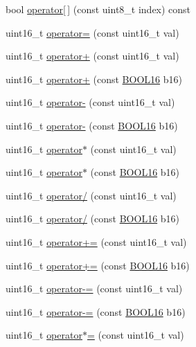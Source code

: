 \begin{DoxyCompactItemize}
bool \hyperlink{struct_b_o_o_l16_ae2e6627d3440c7132acd1933d27b7ac8}{operator\mbox{[}$\,$\mbox{]}} (const uint8\+\_\+t index) const
\item 
uint16\+\_\+t \hyperlink{struct_b_o_o_l16_a337925a096cb05f2d729cec233f672f4}{operator=} (const uint16\+\_\+t val)
\item 
uint16\+\_\+t \hyperlink{struct_b_o_o_l16_a83abcd9bea7824fec9a443f6cd1ea4ef}{operator+} (const uint16\+\_\+t val)
\item 
uint16\+\_\+t \hyperlink{struct_b_o_o_l16_a7b3fdeeb158929cbe1b9e38b7e0addb1}{operator+} (const \hyperlink{struct_b_o_o_l16}{B\+O\+O\+L16} b16)
\item 
uint16\+\_\+t \hyperlink{struct_b_o_o_l16_a5aec2aa08b16b10f49fa019b9d3138e3}{operator-\/} (const uint16\+\_\+t val)
\item 
uint16\+\_\+t \hyperlink{struct_b_o_o_l16_a0c74b8b86a62ddadbc40d39ca74b35a6}{operator-\/} (const \hyperlink{struct_b_o_o_l16}{B\+O\+O\+L16} b16)
\item 
uint16\+\_\+t \hyperlink{struct_b_o_o_l16_a3511b645210e2816f439ea1983fe787e}{operator$\ast$} (const uint16\+\_\+t val)
\item 
uint16\+\_\+t \hyperlink{struct_b_o_o_l16_af563a43c5318213f08a27f7c7414d74a}{operator$\ast$} (const \hyperlink{struct_b_o_o_l16}{B\+O\+O\+L16} b16)
\item 
uint16\+\_\+t \hyperlink{struct_b_o_o_l16_a2cb6c702a1bbc8aa53bdb991135b1906}{operator/} (const uint16\+\_\+t val)
\item 
uint16\+\_\+t \hyperlink{struct_b_o_o_l16_ac7d29d83718de6f76c22a7883472f77c}{operator/} (const \hyperlink{struct_b_o_o_l16}{B\+O\+O\+L16} b16)
\item 
uint16\+\_\+t \hyperlink{struct_b_o_o_l16_a6b2a394d85747eaf07bc1714044f58c3}{operator+=} (const uint16\+\_\+t val)
\item 
uint16\+\_\+t \hyperlink{struct_b_o_o_l16_a7d60f0d408ef0d054697ba07a364a155}{operator+=} (const \hyperlink{struct_b_o_o_l16}{B\+O\+O\+L16} b16)
\item 
uint16\+\_\+t \hyperlink{struct_b_o_o_l16_a9cb670916112ed0a5ef6387e5a029e17}{operator-\/=} (const uint16\+\_\+t val)
\item 
uint16\+\_\+t \hyperlink{struct_b_o_o_l16_a734895715c8196113269c604d8d543be}{operator-\/=} (const \hyperlink{struct_b_o_o_l16}{B\+O\+O\+L16} b16)
\item 
uint16\+\_\+t \hyperlink{struct_b_o_o_l16_a1d95ccb84d72f88eb9d8628aa5aeb752}{operator$\ast$=} (const uint16\+\_\+t val)
\item 

\end{DoxyCompactItemize}
